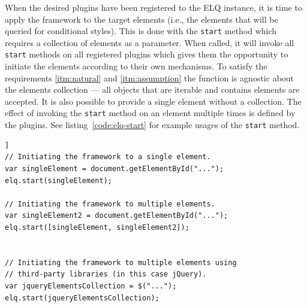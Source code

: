 \documentclass[a4paper,11pt]{kth-mag}
\newcommand{\code}[1]{\texttt{#1}}
\newcommand\abbr[2][]{\uppercase{#2}\ifthenelse{\equal{#1}{}}%
                     {}{#1}}
\begin{document}
          When the desired plugins have been registered to the \abbr{elq} instance, it is time to apply the framework to the target \glspl{element} (i.e., the elements that will be queried for conditional styles).
          This is done with the \code{start} method which requires a collection of \glspl{element} as a parameter.
          When called, it will invoke all \code{start} methods on all registered plugins which gives them the opportunity to initiate the \glspl{element} according to their own mechanisms.
          To satisfy the requirements \ref{itm:natural} and \ref{itm:assumption} the function is agnostic about the \glspl{element} collection --- all objects that are iterable and contains \glspl{element} are accepted.
          It is also possible to provide a single \gls{element} without a collection.
          The effect of invoking the \code{start} method on an element multiple times is defined by the plugins.
          See listing~\ref{code:elq-start} for example usages of the \code{start} method.
          \begin{lstlisting}[caption={Example usages of the \code{start} method. The method only requires an iterable collection, so it is library agnostic.},captionpos=b,label={code:elq-start}]]
// Initiating the framework to a single element.
var singleElement = document.getElementById("...");
elq.start(singleElement);

// Initiating the framework to multiple elements.
var singleElement2 = document.getElementById("...");
elq.start([singleElement, singleElement2]);


// Initiating the framework to multiple elements using
// third-party libraries (in this case jQuery).
var jqueryElementsCollection = $("...");
elq.start(jqueryElementsCollection);
          \end{lstlisting}
\end{document}
